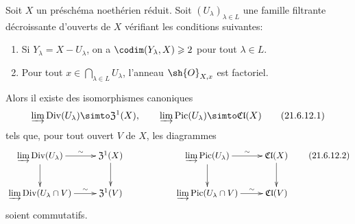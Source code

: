\begin{proposition}[21.6.12]
\label{IV.21.6.12}
Soit $X$ un préschéma noethérien réduit.
Soit $(U_\lambda)_{\lambda\in L}$ une famille filtrante décroissante d'ouverts de $X$ vérifiant les conditions suivantes:
\begin{enumerate}
  \item[\rm 1\textsuperscript{o}] Si $Y_\lambda=X-U_\lambda$, on a $\codim(Y_\lambda,X)\geq2$ pour tout $\lambda\in L$.
  \item[\rm 2\textsuperscript{o}] Pour tout $x\in\bigcap_{\lambda\in L}U_\lambda$, l'anneau $\sh{O}_{X,x}$ est factoriel.
\end{enumerate}
Alors il existe des isomorphismes canoniques
\[
\label{IV.21.6.12.1}
  \varinjlim\operatorname{Div}(U_\lambda)\simto\mathfrak{Z}^1(X),\qquad
  \varinjlim\operatorname{Pic}(U_\lambda)\simto\mathfrak{Cl}(X)
  \tag{21.6.12.1}
\]
tels que, pour tout ouvert $V$ de $X$, les diagrammes
\[
\label{IV.21.6.12.2}
  \xymatrix{
    \varinjlim\operatorname{Div}(U_\lambda) \ar[r]^-\sim \ar[d] & \mathfrak{Z}^1(X) \ar[d] & & \varinjlim\operatorname{Pic}(U_\lambda) \ar[r]^-\sim \ar[d] & \mathfrak{Cl}(X) \ar[d]\\
    \varinjlim\operatorname{Div}(U_\lambda\cap V) \ar[r]^-\sim & \mathfrak{Z}^1(V) & & \varinjlim\operatorname{Pic}(U_\lambda\cap V) \ar[r]^-\sim & \mathfrak{Cl}(V)
  }
  \tag{21.6.12.2}
\]
soient commutatifs.
\end{proposition}

